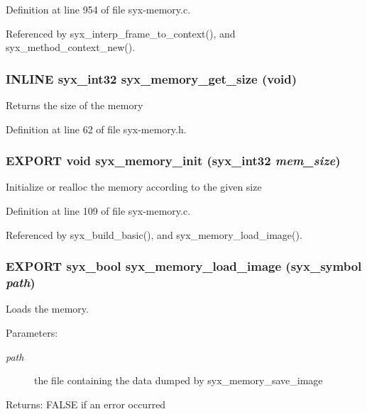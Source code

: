 Definition at line 954 of file syx-memory.c.

Referenced by syx\_\-interp\_\-frame\_\-to\_\-context(), and syx\_\-method\_\-context\_\-new().\hypertarget{syx-memory_8h_d7aa0c051c34d4da60dcb1bfb4a39775}{
\subsubsection{\setlength{\rightskip}{0pt plus 5cm}INLINE {\bf syx\_\-int32} syx\_\-memory\_\-get\_\-size (void)}}
\label{syx-memory_8h_d7aa0c051c34d4da60dcb1bfb4a39775}


Returns the size of the memory 

Definition at line 62 of file syx-memory.h.\hypertarget{syx-memory_8h_565e4803168ca5fa99145c0d15d2da24}{
\subsubsection{\setlength{\rightskip}{0pt plus 5cm}EXPORT void syx\_\-memory\_\-init ({\bf syx\_\-int32} {\em mem\_\-size})}}
\label{syx-memory_8h_565e4803168ca5fa99145c0d15d2da24}


Initialize or realloc the memory according to the given size 

Definition at line 109 of file syx-memory.c.

Referenced by syx\_\-build\_\-basic(), and syx\_\-memory\_\-load\_\-image().\hypertarget{syx-memory_8h_4d442554bbb25bf71781ba6abfa30819}{
\subsubsection{\setlength{\rightskip}{0pt plus 5cm}EXPORT {\bf syx\_\-bool} syx\_\-memory\_\-load\_\-image ({\bf syx\_\-symbol} {\em path})}}
\label{syx-memory_8h_4d442554bbb25bf71781ba6abfa30819}


Loads the memory.

\begin{Desc}
\item[Parameters:]
\begin{description}
\item[{\em path}]the file containing the data dumped by syx\_\-memory\_\-save\_\-image \end{description}
\end{Desc}
\begin{Desc}
\item[Returns:]FALSE if an error occurred \end{Desc}


